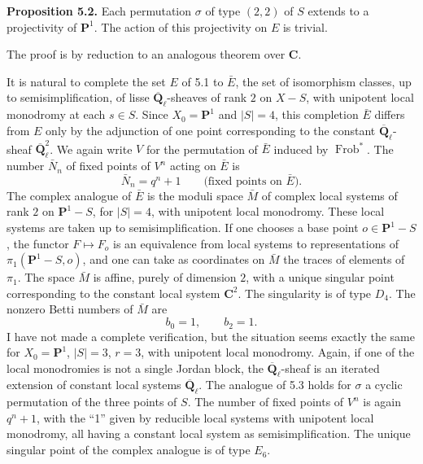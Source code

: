 \documentclass[11pt]{article}
\newcommand{\Qbar}{\overline{\mathbf Q}}
\newcommand{\Frob}{\operatorname{Frob}}
\begin{document}
\textbf{Proposition 5.2.} Each permutation \(\sigma\) of type \((2,2)\) of \(S\) extends to a projectivity of \(\mathbf P^1\). The action of this projectivity on \(E\) is trivial.

The proof is by reduction to an analogous theorem over \(\mathbf C\).

It is natural to complete the set \(E\) of 5.1 to \(\bar E\), the set of isomorphism classes, up to semisimplification, of lisse \(\Qbar_\ell\)-sheaves of rank \(2\) on \(X-S\), with unipotent local monodromy at each \(s\in S\). Since \(X_0=\mathbf P^1\) and \(|S|=4\), this completion \(\bar E\) differs from \(E\) only by the adjunction of one point corresponding to the constant \(\Qbar_\ell\)-sheaf \(\Qbar_\ell^2\). We again write \(V\) for the permutation of \(\bar E\) induced by \(\Frob^*\). The number \(\bar N_n\) of fixed points of \(V^n\) acting on \(\bar E\) is
\begin{equation}\tag{5.3.1}
\bar N_n=q^n+1\qquad \text{(fixed points on \(\bar E\)).}
\end{equation}
The complex analogue of \(\bar E\) is the moduli space \(\bar M\) of complex local systems of rank \(2\) on \(\mathbf P^1-S\), for \(|S|=4\), with unipotent local monodromy. These local systems are taken up to semisimplification. If one chooses a base point \(o\in\mathbf P^1-S\), the functor \(F\mapsto F_o\) is an equivalence from local systems to representations of \(\pi_1(\mathbf P^1-S,o)\), and one can take as coordinates on \(\bar M\) the traces of elements of \(\pi_1\). The space \(\bar M\) is affine, purely of dimension \(2\), with a unique singular point corresponding to the constant local system \(\mathbf C^2\). The singularity is of type \(D_4\). The nonzero Betti numbers of \(\bar M\) are
\begin{equation}\tag{5.4.1}
b_0=1,\qquad b_2=1.
\end{equation}
I have not made a complete verification, but the situation seems exactly the same for \(X_0=\mathbf P^1\), \(|S|=3\), \(r=3\), with unipotent local monodromy. Again, if one of the local monodromies is not a single Jordan block, the \(\Qbar_\ell\)-sheaf is an iterated extension of constant local systems \(\Qbar_\ell\). The analogue of 5.3 holds for \(\sigma\) a cyclic permutation of the three points of \(S\). The number of fixed points of \(V^n\) is again \(q^n+1\), with the ``1'' given by reducible local systems with unipotent local monodromy, all having a constant local system as semisimplification. The unique singular point of the complex analogue is of type \(E_6\).
\end{document}
